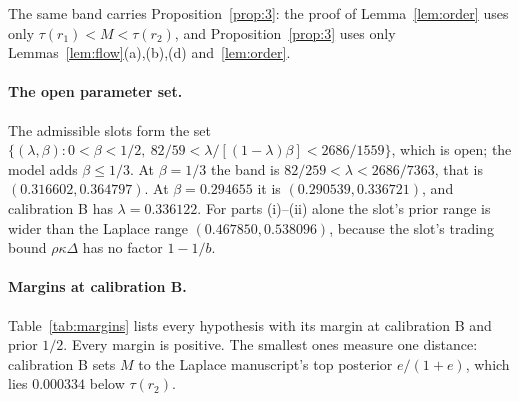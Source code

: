 \documentclass[11pt]{article}
\theoremstyle{definition}
\begin{document}
The same band carries Proposition~\ref{prop:3}: the proof of Lemma~\ref{lem:order} uses only
$\tau(r_1)<M<\tau(r_2)$, and Proposition~\ref{prop:3} uses only Lemmas~\ref{lem:flow}(a),(b),(d)
and~\ref{lem:order}.

\paragraph{The open parameter set.} The admissible slots form the set
$\{(\lambda,\beta):0<\beta<1/2,\ 82/59<\lambda/[(1-\lambda)\beta]<2686/1559\}$, which is open; the model adds
$\beta\le1/3$. At $\beta=1/3$ the band is $82/259<\lambda<2686/7363$, that is $(0.316602,0.364797)$. At
$\beta=0.294655$ it is $(0.290539,0.336721)$, and calibration B has $\lambda=0.336122$. For parts (i)--(ii) alone
the slot's prior range is wider than the Laplace range $(0.467850,0.538096)$, because the slot's trading bound
$\rho\kappa\Delta$ has no factor $1-1/b$.

\paragraph{Margins at calibration B.} Table~\ref{tab:margins} lists every hypothesis with its margin at
calibration B and prior $1/2$. Every margin is positive. The smallest ones measure one distance: calibration B
sets $M$ to the Laplace manuscript's top posterior $e/(1+e)$, which lies $0.000334$ below $\tau(r_2)$.
\end{document}
